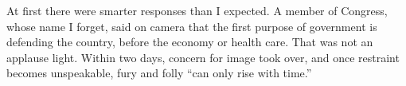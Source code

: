 At first there were smarter responses than I expected. A member of Congress, whose name I forget, said on camera that the first purpose of government is defending the country, before the economy or health care. That was not an applause light. Within two days, concern for image took over, and once restraint becomes unspeakable, fury and folly ``can only rise with time.'' 
